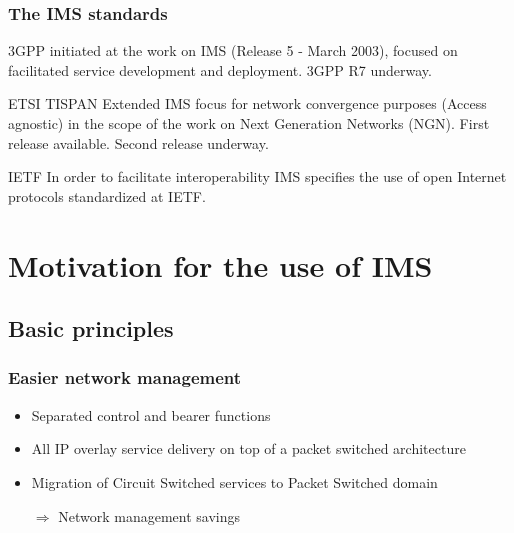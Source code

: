 \documentclass[pdf]{beamer}
\begin{document}
\begin{frame}
    \frametitle{The IMS standards}
     \begin{block}{3GPP}
      initiated at the work on IMS (Release 5 - March 2003), focused on facilitated service development and deployment.
      3GPP R7 underway.   
     \end{block}
     \pause
     \begin{block}{ETSI TISPAN}
        Extended IMS focus for network convergence purposes (Access agnostic) in the scope of the work on Next Generation Networks (NGN).
        First release available. Second release underway.
     \end{block}
     \pause
     \begin{block}{IETF}
        In order to facilitate interoperability IMS specifies the use of open Internet protocols standardized at IETF.
     \end{block}
\end{frame}


\section{Motivation for the use of IMS}
    \subsection{Basic principles}
    \begin{frame}
        \frametitle{Easier network management}
        \begin{itemize}
            \item Separated control and bearer functions
            \item All IP overlay service delivery on top of a packet switched architecture
            \item Migration of Circuit Switched services to Packet Switched domain
            \pause
            \item[$\Rightarrow$] Network management savings
        \end{itemize}
    \end{frame} 
   
   
\end{document}
